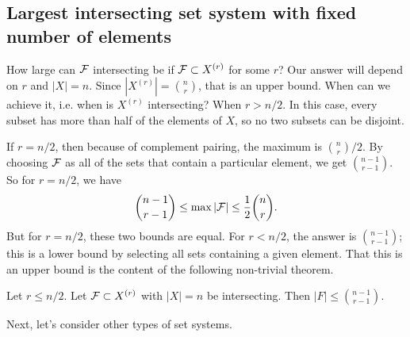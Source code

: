 \subsection*{Largest intersecting set system with fixed number of elements}
How large can $\mathcal{F}$ intersecting be if $\mathcal{F}\subset X^{(r)}$ for some $r$? Our answer will depend on $r$ and $|X| = n$. Since $|X^{(r)}| = {n \choose r}$, that is an upper bound. When can we achieve it, i.e. when is $X^{(r)}$ intersecting? When $r > n/2$. In this case, every subset has more than half of the elements of $X$, so no two subsets can be disjoint.

If $r = n/2$, then because of  complement pairing, the maximum is ${n \choose r}/2$. By choosing $\mathcal{F}$ as all of the sets that contain a particular element, we get ${n -1\choose r-1}$. So for $r=n/2$, we have
\[
 {n-1\choose r-1} \leq \max |\mathcal{F}| \leq \frac{1}{2}{n\choose r}.
\]
But for $r=n/2$, these two bounds are equal.
For $r< n/2$, the answer is ${n -1 \choose r-1}$; this is a lower bound by selecting all sets containing a given element.  That this is an upper bound is the content of the following non-trivial theorem.
\begin{theorem*} 
Let $r\leq n/2$. Let $\mathcal{F}\subset X^{(r)}$ with $|X| = n$ be intersecting. Then $|F| \leq { n-1\choose r-1}$.
\end{theorem*}

Next, let's consider other types of set systems.
